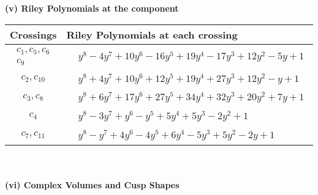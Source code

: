 \documentclass[1p]{elsarticle_modified}
\theoremstyle{definition}
\begin{document}
\newpage\renewcommand{\arraystretch}{1}
\flushleft \textbf{(v) Riley Polynomials at the component}\newline \\
\begin{tabular}{m{50pt}|m{274pt}}
Crossings & \hspace{64pt}Riley Polynomials at each crossing \\
\hline $$\begin{aligned}c_{1},c_{5},c_{6}\\c_{9}\end{aligned}$$&$\begin{aligned}
&y^8-4 y^7+10 y^6-16 y^5+19 y^4-17 y^3+12 y^2-5 y+1
\end{aligned}$\\
\hline $$\begin{aligned}c_{2},c_{10}\end{aligned}$$&$\begin{aligned}
&y^8+4 y^7+10 y^6+12 y^5+19 y^4+27 y^3+12 y^2- y+1
\end{aligned}$\\
\hline $$\begin{aligned}c_{3},c_{8}\end{aligned}$$&$\begin{aligned}
&y^8+6 y^7+17 y^6+27 y^5+34 y^4+32 y^3+20 y^2+7 y+1
\end{aligned}$\\
\hline $$\begin{aligned}c_{4}\end{aligned}$$&$\begin{aligned}
&y^8-3 y^7+y^6- y^5+5 y^4+5 y^3-2 y^2+1
\end{aligned}$\\
\hline $$\begin{aligned}c_{7},c_{11}\end{aligned}$$&$\begin{aligned}
&y^8- y^7+4 y^6-4 y^5+6 y^4-5 y^3+5 y^2-2 y+1
\end{aligned}$\\
\hline
\end{tabular}\\~\\
\newpage\flushleft \textbf{(vi) Complex Volumes and Cusp Shapes}
\end{document}
